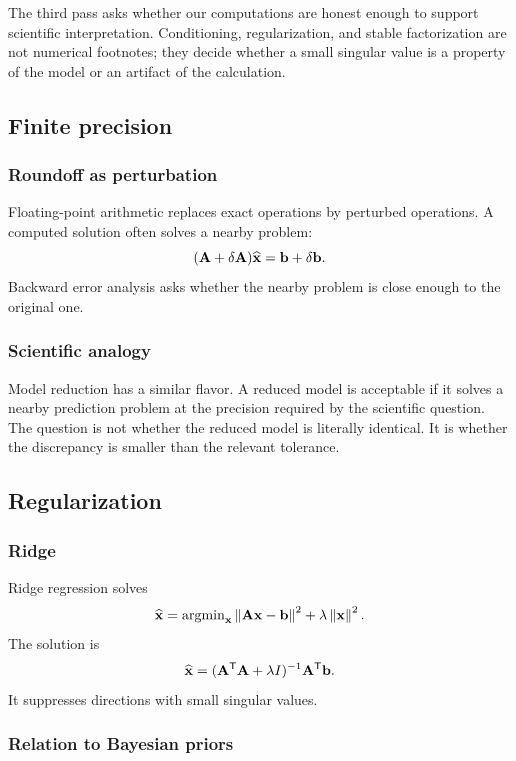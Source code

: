 \noindent
The third pass asks whether our computations are honest enough to support scientific interpretation.  Conditioning, regularization, and stable factorization are not numerical footnotes; they decide whether a small singular value is a property of the model or an artifact of the calculation.

\subsection{Finite precision}

\subsubsection*{Roundoff as perturbation}

Floating-point arithmetic replaces exact operations by perturbed operations.  A computed solution often solves a nearby problem:
\[
  (\mathbf{A}+\delta\mathbf{A})\widehat{\mathbf{x}}=\mathbf{b}+\delta\mathbf{b}.
\]
Backward error analysis asks whether the nearby problem is close enough to the original one.

\subsubsection*{Scientific analogy}

Model reduction has a similar flavor.  A reduced model is acceptable if it solves a nearby prediction problem at the precision required by the scientific question.  The question is not whether the reduced model is literally identical.  It is whether the discrepancy is smaller than the relevant tolerance.

\subsection{Regularization}

\subsubsection*{Ridge}

Ridge regression solves
\[
  \widehat{\mathbf{x}}
  =
  \operatorname{argmin}_{\mathbf{x}}
  \left\lVert \mathbf{A}\mathbf{x}-\mathbf{b}\right\rVert^2
  +
  \lambda\left\lVert \mathbf{x}\right\rVert^2.
\]
The solution is
\[
  \widehat{\mathbf{x}}
  =
  (\mathbf{A}^{\mathsf{T}}\mathbf{A}+\lambda I)^{-1}
  \mathbf{A}^{\mathsf{T}}\mathbf{b}.
\]
It suppresses directions with small singular values.

\subsubsection*{Relation to Bayesian priors}

